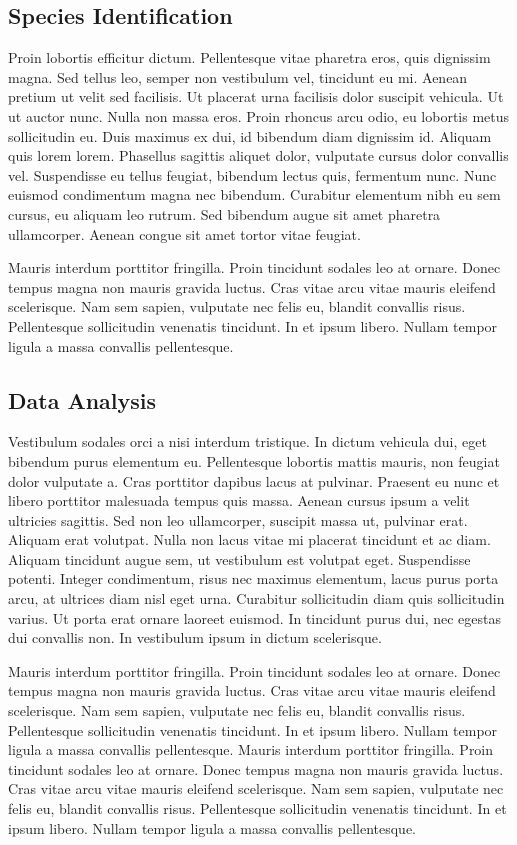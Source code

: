 \documentclass[a4paper]{LTJournalArticle}
\begin{document}
	\subsection{Species Identification}
	
	Proin lobortis efficitur dictum. Pellentesque vitae pharetra eros, quis dignissim magna. Sed tellus leo, semper non vestibulum vel, tincidunt eu mi. Aenean pretium ut velit sed facilisis. Ut placerat urna facilisis dolor suscipit vehicula. Ut ut auctor nunc. Nulla non massa eros. Proin rhoncus arcu odio, eu lobortis metus sollicitudin eu. Duis maximus ex dui, id bibendum diam dignissim id. Aliquam quis lorem lorem. Phasellus sagittis aliquet dolor, vulputate cursus dolor convallis vel. Suspendisse eu tellus feugiat, bibendum lectus quis, fermentum nunc. Nunc euismod condimentum magna nec bibendum. Curabitur elementum nibh eu sem cursus, eu aliquam leo rutrum. Sed bibendum augue sit amet pharetra ullamcorper. Aenean congue sit amet tortor vitae feugiat.
	
	Mauris interdum porttitor fringilla. Proin tincidunt sodales leo at ornare. Donec tempus magna non mauris gravida luctus. Cras vitae arcu vitae mauris eleifend scelerisque. Nam sem sapien, vulputate nec felis eu, blandit convallis risus. Pellentesque sollicitudin venenatis tincidunt. In et ipsum libero. Nullam tempor ligula a massa convallis pellentesque.
	
	\subsection{Data Analysis}
	
	Vestibulum sodales orci a nisi interdum tristique. In dictum vehicula dui, eget bibendum purus elementum eu. Pellentesque lobortis mattis mauris, non feugiat dolor vulputate a. Cras porttitor dapibus lacus at pulvinar. Praesent eu nunc et libero porttitor malesuada tempus quis massa. Aenean cursus ipsum a velit ultricies sagittis. Sed non leo ullamcorper, suscipit massa ut, pulvinar erat. Aliquam erat volutpat. Nulla non lacus vitae mi placerat tincidunt et ac diam. Aliquam tincidunt augue sem, ut vestibulum est volutpat eget. Suspendisse potenti. Integer condimentum, risus nec maximus elementum, lacus purus porta arcu, at ultrices diam nisl eget urna. Curabitur sollicitudin diam quis sollicitudin varius. Ut porta erat ornare laoreet euismod. In tincidunt purus dui, nec egestas dui convallis non. In vestibulum ipsum in dictum scelerisque.
	
	Mauris interdum porttitor fringilla. Proin tincidunt sodales leo at ornare. Donec tempus magna non mauris gravida luctus. Cras vitae arcu vitae mauris eleifend scelerisque. Nam sem sapien, vulputate nec felis eu, blandit convallis risus. Pellentesque sollicitudin venenatis tincidunt. In et ipsum libero. Nullam tempor ligula a massa convallis pellentesque. Mauris interdum porttitor fringilla. Proin tincidunt sodales leo at ornare. Donec tempus magna non mauris gravida luctus. Cras vitae arcu vitae mauris eleifend scelerisque. Nam sem sapien, vulputate nec felis eu, blandit convallis risus. Pellentesque sollicitudin venenatis tincidunt. In et ipsum libero. Nullam tempor ligula a massa convallis pellentesque.
	
\end{document}
